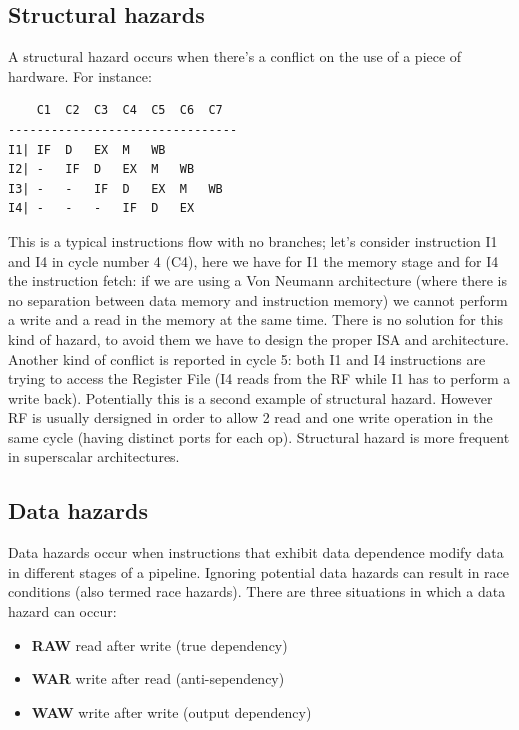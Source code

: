 \subsection{Structural hazards}
A structural hazard occurs when there's a conflict on the use of a piece of
hardware. For instance:
\begin{verbatim}
    C1  C2  C3  C4  C5  C6  C7
--------------------------------
I1| IF  D   EX  M   WB
I2| -   IF  D   EX  M   WB
I3| -   -   IF  D   EX  M   WB
I4| -   -   -   IF  D   EX
\end{verbatim}
This is a typical instructions flow with no branches; let's consider instruction
I1 and I4 in cycle number 4 (C4), here we have for I1 the memory stage and for
I4 the instruction fetch: if we are using a Von Neumann architecture (where
there is no separation between data memory and instruction memory) we cannot
perform a write and a read in the memory at the same time. There is no solution
for this kind of hazard, to avoid them we have to design the proper ISA and
architecture.\\
Another kind of conflict is reported in cycle 5: both I1 and I4 instructions are
trying to access the Register File (I4 reads from the RF while I1 has to perform
a write back).  Potentially this is a second example of structural hazard.
However RF is usually dersigned in order to allow 2 read and one write operation
in the same cycle (having distinct ports for each op).
Structural hazard is more frequent in superscalar architectures.
\subsection{Data hazards}
Data hazards occur when instructions that exhibit data dependence modify data in
different stages of a pipeline. Ignoring potential data hazards can result in
race conditions (also termed race hazards). There are three situations in which
a data hazard can occur:
\begin{itemize}
  \item \textbf{RAW} read after write (true dependency)
  \item \textbf{WAR} write after read (anti-sependency)
  \item \textbf{WAW} write after write (output dependency)
\end{itemize}
